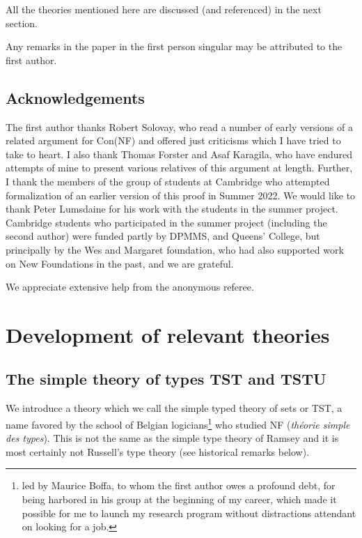 \documentclass{article}
\theoremstyle{definition}
\theoremstyle{remark}
\begin{document}
{All the theories mentioned here are discussed (and referenced) in the next section.

Any remarks in the paper in the first person singular may be attributed to the first author.

\subsection{Acknowledgements}

The first author thanks Robert Solovay, who read a number of early versions of a related argument for Con(NF) and offered just criticisms which I have tried to take to heart.  I also thank Thomas Forster and Asaf Karagila, who have endured attempts of mine to present various relatives of this argument at length.  Further, I thank the members of the group of students at Cambridge who attempted formalization of an earlier version of this proof in Summer 2022.  We would like to thank Peter Lumsdaine for his work with the students in the summer project.   Cambridge students who participated in the summer project (including the second author) were funded partly by DPMMS, and Queens' College, but principally by the Wes and Margaret foundation, who had also supported work on New Foundations in the past, and we are grateful.

We appreciate extensive help from the anonymous referee.



\newpage

\section{Development of relevant theories}



\subsection{The simple theory of types TST and TSTU}

We introduce a theory which we call the simple typed theory of sets or TST, a name favored by the school of Belgian logicians\footnote{led by Maurice Boffa, to whom the first author owes a profound debt, for being harbored in his group at the beginning of my career, which made it possible for me to launch my research program without distractions attendant on looking for a job.} who studied NF ({\em th\'eorie simple des types}).  This is not the same as the simple type theory of Ramsey and it is most certainly not Russell's type theory  (see historical remarks below).



}
\end{document}
